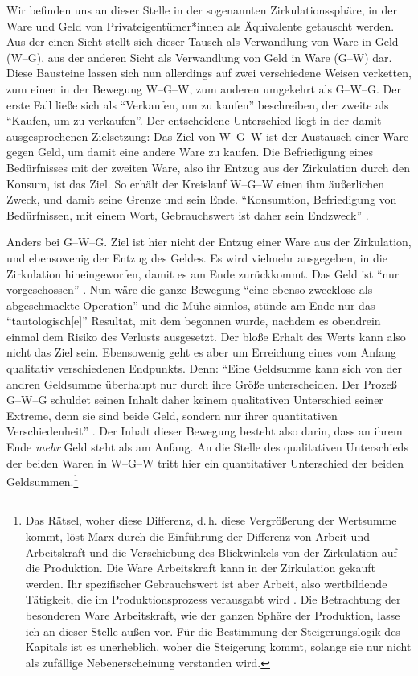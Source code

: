 \documentclass[12pt,
               DIV13,
               paper=a4,
               twoside=false,
               onehalfspacing,
               bibliography=totoc,
               toc=graduated,
               draft,
               ]{scrartcl}
\newcommand{\pc}[2]{\parencite[#1]{#2}}
\newcommand{\vgl}[2]{\parencite[vgl.][#1]{#2}}
\newcommand{\worries}[1]{\ifdraft{\textcolor{blue}{\texttt{(#1)}}}{}}
\newcommand{\wgw}{W--G--W\xspace}
\begin{document}


Wir befinden uns an dieser Stelle in der sogenannten
Zirkulationssphäre, in der Ware und Geld von Privateigentümer*innen
als Äquivalente getauscht werden. Aus der einen Sicht stellt sich
dieser Tausch als Verwandlung von Ware in Geld (W--G), aus der anderen
Sicht als Verwandlung von Geld in Ware (G--W) dar. Diese Bausteine
lassen sich nun allerdings auf zwei verschiedene Weisen verketten, zum
einen in der Bewegung \wgw, zum anderen umgekehrt als G--W--G. Der
erste Fall ließe sich als "`Verkaufen, um zu kaufen"' beschreiben, der
zweite als "`Kaufen, um zu verkaufen"'. Der entscheidene Unterschied
liegt in der damit ausgesprochenen Zielsetzung: Das Ziel von \wgw ist
der Austausch einer Ware gegen Geld, um damit eine andere Ware zu
kaufen.
Die Befriedigung eines Bedürfnisses mit der zweiten Ware, also ihr
Entzug aus der Zirkulation durch den Konsum, ist das Ziel. So erhält
der Kreislauf \wgw einen ihm äußerlichen Zweck, und damit seine Grenze
und sein Ende. "`Konsumtion, Befriedigung von Bedürfnissen, mit einem
Wort, Gebrauchswert ist daher sein Endzweck"' \pc{164}{kap}.


Anders bei G--W--G. Ziel ist hier nicht der Entzug einer Ware aus der
Zirkulation, und ebensowenig der Entzug des Geldes. Es wird vielmehr
ausgegeben, in die Zirkulation hineingeworfen, damit es am Ende
zurückkommt. Das Geld ist "`nur vorgeschossen"' \pc{163}{kap}. Nun
wäre die ganze Bewegung "`eine ebenso zwecklose als abgeschmackte
Operation"' \pc{165}{kap} und die Mühe sinnlos, stünde am Ende nur das
"`tautologisch[e]"' \pc{164}{kap} Resultat, mit dem begonnen wurde,
nachdem es obendrein einmal dem Risiko des Verlusts ausgesetzt. Der
bloße Erhalt des Werts kann also nicht das Ziel sein. Ebensowenig geht
es aber um Erreichung eines vom Anfang qualitativ verschiedenen
Endpunkts. Denn: "`Eine Geldsumme kann sich von der andren Geldsumme
überhaupt nur durch ihre Größe unterscheiden. Der Prozeß G--W--G
schuldet seinen Inhalt daher keinem qualitativen Unterschied seiner
Extreme, denn sie sind beide Geld, sondern nur ihrer quantitativen
Verschiedenheit"' \pc{165}{kap}. Der Inhalt dieser Bewegung besteht
also darin, dass an ihrem Ende \emph{mehr} Geld steht als am Anfang.
An die Stelle des qualitativen Unterschieds der beiden Waren in \wgw
tritt hier ein quantitativer Unterschied der beiden
Geldsummen.\footnote{Das Rätsel, woher diese Differenz, d.\,h. diese
Vergrößerung der Wertsumme kommt, löst Marx durch die Einführung der
Differenz von Arbeit und Arbeitskraft und die Verschiebung des
Blickwinkels von der Zirkulation auf die Produktion. Die Ware
Arbeitskraft kann in der Zirkulation gekauft werden. Ihr spezifischer
Gebrauchswert ist aber Arbeit, also wertbildende Tätigkeit, die im
Produktionsprozess verausgabt wird \vgl{xx}{kap}. Die Betrachtung der
besonderen Ware Arbeitskraft, wie der ganzen Sphäre der Produktion,
lasse ich an dieser Stelle außen vor. Für die Bestimmung der
Steigerungslogik des Kapitals ist es unerheblich, woher die Steigerung
kommt, solange sie nur nicht als zufällige Nebenerscheinung verstanden
wird.\worries{?}}
\end{document}
